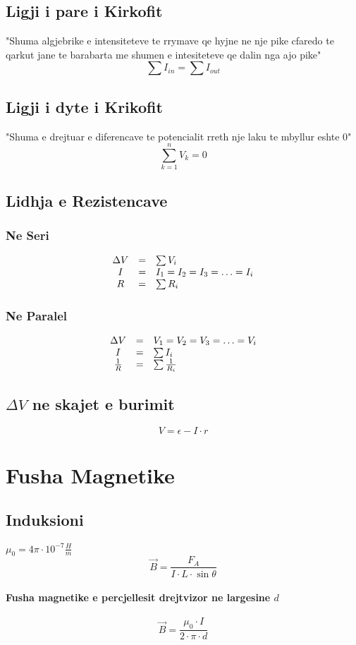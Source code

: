 \documentclass[a4paper, twocolumn]{article}
\begin{document}
\subsection{Ligji i pare i Kirkofit}
"Shuma algjebrike e intensiteteve te rrymave qe hyjne ne nje pike cfaredo te qarkut jane te barabarta me shumen e intesiteteve qe dalin nga ajo pike"
\[
	\sum I_{in} = \sum I_{out}
\]
\subsection{Ligji i dyte i Krikofit}
"Shuma e drejtuar e diferencave te potencialit rreth nje laku te mbyllur eshte 0"
\[
	\sum_{k=1}^{n}V_{k}=0
\]
\subsection{Lidhja e Rezistencave}
\subsubsection{Ne Seri}
\[
	\begin{array}{c c l}
		\Delta V &=& \sum V_{i}\\
		I&=& I_1=I_2=I_3=\ldots =I_i  \\
	R&=&\sum R_{i} \\
\end{array}
\]
\subsubsection{Ne Paralel}
\[
\begin{array}{c c l}
	\Delta V&=&V_1=V_2=V_3=\ldots=V_i\\
	I&=& \sum I_i \\
	\frac{1}{R}&=&\sum \frac{1}{R_{i}}
\end{array}
\]
\subsection{$\Delta V$ ne skajet e burimit}
\[
V = \epsilon - I \cdot r
\]
\section{Fusha Magnetike}
\subsection{Induksioni}
$\mu_0=4\pi\cdot 10^{-7} \frac{H}{m} $
\[
	\vec{B} = \frac{F_{A}}{I\cdot L\cdot \sin{\theta}}
\]
\paragraph{Fusha magnetike e percjellesit drejtvizor ne largesine $d$}
\[
	\vec{B} = \frac{\mu_0\cdot I}{2\cdot \pi \cdot d}
\]
\end{document}
